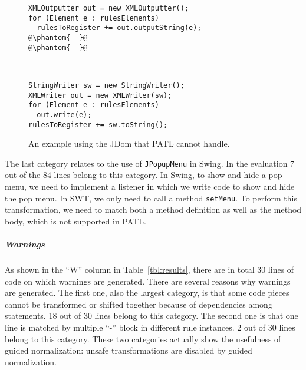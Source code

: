 \documentclass[a4paper, USenglish]{lipics-v2016}
\newenvironment{smpage}[1]
{\begin{lrbox}{\fmbox}\begin{minipage}{#1}}
{\end{minipage}\end{lrbox}\usebox{\fmbox}}
\newcommand{\code}[1]{\texttt{\footnotesize #1}}
\newcommand{\PATL}{PATL\xspace}
\theoremstyle{plain}
\begin{document}
\begin{figure}[ht]
\vspace{-7pt}
\begin{center}
\begin{smpage}{0.48\columnwidth}
\begin{lstlisting}[style=java,frame=none,numbers=none,basicstyle=\ttfamily\scriptsize]
XMLOutputter out = new XMLOutputter();
for (Element e : rulesElements) 
  rulesToRegister += out.outputString(e);
@\phantom{--}@
@\phantom{--}@
\end{lstlisting}
\end{smpage}
~~
\begin{smpage}{0.44\columnwidth}
\begin{lstlisting}[style=java,frame=none,numbers=none,basicstyle=\ttfamily\scriptsize]
StringWriter sw = new StringWriter();
XMLWriter out = new XMLWriter(sw);
for (Element e : rulesElements) 
  out.write(e);
rulesToRegister += sw.toString();
\end{lstlisting}
\end{smpage}
\end{center}
\vspace{-18pt}
\caption{An example using the JDom that \PATL cannot handle.}
\vspace{-12pt}
\label{fg:untransformable}
\end{figure}

The last category relates to the use of \code{JPopupMenu} in Swing.
In the evaluation 7 out of the 84 lines belong to this category. In
Swing, to show and hide a pop menu, we need to implement a listener in
which we write code to show and hide the pop menu. In SWT, we only
need to call a method \code{setMenu}. To perform this transformation,
we need to match both a method definition as well as the method body,
which is not supported in \PATL.


\subparagraph*{Warnings}
As shown in the ``W'' column in Table~\ref{tbl:results}, there are in
total 30 lines of code on which warnings are generated. There are
several reasons why warnings are generated. The first one, also the
largest category, is that some code pieces
cannot be transformed or shifted together because of dependencies
among statements. 18 out of 30 lines belong to this category. The
second one is that one line is matched by multiple ``-'' block in
different rule instances. 2 out of 30 lines belong to this category.
These two categories
actually show the usefulness of guided normalization: unsafe
transformations are disabled by guided normalization. 
\end{document}
